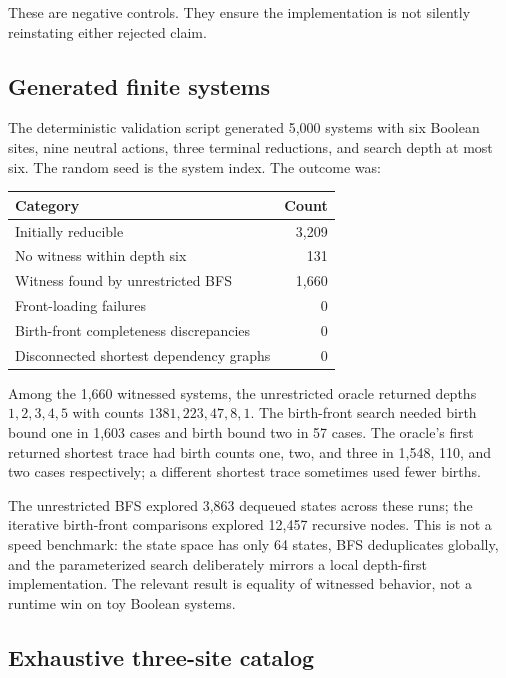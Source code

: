 These are negative controls.  They ensure the implementation is not silently
reinstating either rejected claim.

\subsection{Generated finite systems}

The deterministic validation script generated 5,000 systems with six Boolean
sites, nine neutral actions, three terminal reductions, and search depth at most
six.  The random seed is the system index.  The outcome was:

\begin{center}
\begin{tabular}{@{}lr@{}}
\toprule
Category & Count \\
\midrule
Initially reducible & 3,209 \\
No witness within depth six & 131 \\
Witness found by unrestricted BFS & 1,660 \\
Front-loading failures & 0 \\
Birth-front completeness discrepancies & 0 \\
Disconnected shortest dependency graphs & 0 \\
\bottomrule
\end{tabular}
\end{center}

Among the 1,660 witnessed systems, the unrestricted oracle returned depths
$1,2,3,4,5$ with counts $1381,223,47,8,1$.  The birth-front search needed birth
bound one in 1,603 cases and birth bound two in 57 cases.  The oracle's first
returned shortest trace had birth counts one, two, and three in 1,548, 110, and
two cases respectively; a different shortest trace sometimes used fewer births.

The unrestricted BFS explored 3,863 dequeued states across these runs; the
iterative birth-front comparisons explored 12,457 recursive nodes.  This is not
a speed benchmark: the state space has only 64 states, BFS deduplicates globally,
and the parameterized search deliberately mirrors a local depth-first
implementation.  The relevant result is equality of witnessed behavior, not a
runtime win on toy Boolean systems.

\subsection{Exhaustive three-site catalog}

